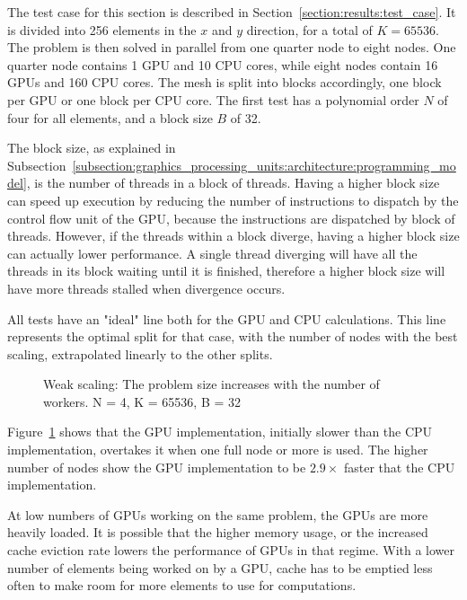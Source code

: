 The test case for this section is described in Section~\ref{section:results:test_case}. It is
divided into 256 elements in the $x$ and $y$ direction, for a total of $K = 65536$. The problem is
then solved in parallel from one quarter node to eight nodes. One quarter node contains 1 GPU and 10
CPU cores, while eight nodes contain 16 GPUs and 160 CPU cores. The mesh is split into blocks
accordingly, one block per GPU or one block per CPU core. The first test has a polynomial order $N$
of four for all elements, and a block size $B$ of 32. 

The block size, as explained in
Subsection~\ref{subsection:graphics_processing_units:architecture:programming_model}, is the number
of threads in a block of threads. Having a higher block size can speed up execution by reducing the
number of instructions to dispatch by the control flow unit of the GPU, because the instructions are
dispatched by block of threads. However, if the threads within a block diverge, having a higher
block size can actually lower performance. A single thread diverging will have all the threads in
its block waiting until it is finished, therefore a higher block size will have more threads stalled
when divergence occurs.

All tests have an "ideal" line both for the GPU and CPU calculations. This line represents the
optimal split for that case, with the number of nodes with the best scaling, extrapolated linearly
to the other splits.

\begin{figure}[H]
	\centering
	
	\caption{Weak scaling: The problem size increases with the number of workers. N = 4, K = 65536, B = 32}
	\label{fig:strong_scaling_N4_W32}
\end{figure}

Figure~\ref{fig:strong_scaling_N4_W32} shows that the GPU implementation, initially slower than the
CPU implementation, overtakes it when one full node or more is used. The higher number of nodes show
the GPU implementation to be $2.9 \times$ faster that the CPU implementation.

At low numbers of GPUs working on the same problem, the GPUs are more heavily loaded. It is possible
that the higher memory usage, or the increased cache eviction rate lowers the performance of GPUs in
that regime. With a lower number of elements being worked on by a GPU, cache has to be emptied less
often to make room for more elements to use for computations.

